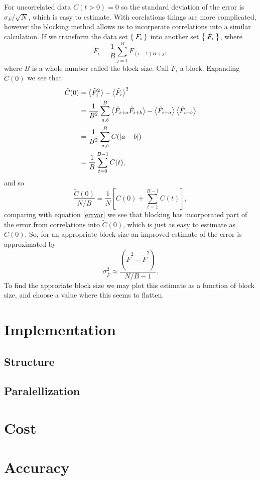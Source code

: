 \documentclass[a4paper,English,10pt]{article}
\newcommand{\be}{\begin{equation}}
\newcommand{\ee}{\end{equation}}
\newcommand{\f}{\frac}
\renewcommand{\bar}{\overline}
\renewcommand{\braket}{\Braket}
\begin{document}
For uncorrelated data $C(t>0) = 0$ so the standard deviation of the error is $\sigma_F/\sqrt{N}$, which is easy to estimate.
With corelations things are more complicated, however the blocking method allows us to incorperate correlations into a similar calculation.
If we transform the data set $\Set{F_i}$ into another set $\Set{\tilde{F}_i}$, where
\be
\tilde{F}_i = \f{1}{B}\sum_{j=1}^{B}F_{(i-1)B+j},\label{block}
\ee
where $B$ is a whole number called the block size. Call $\tilde{F}_i$ a block.
Expanding $\tilde{C}(0)$ we see that
\begin{align*}
  \tilde{C}(0) &= \braket{\tilde{F}_i^2}-\braket{\tilde{F}_i}^2\\
  &= \f{1}{B^2}\sum_{a,b}^B\braket{\tilde{F}_{i+a}\tilde{F}_{i+b}}-\braket{\tilde{F}_{i+a}}\braket{\tilde{F}_{i+b}}\\
  &= \f{1}{B^2}\sum_{a,b}^BC(|a-b|)\\
  &= \f{1}{B}\sum_{t=0}^{B-1}C(t),
\end{align*}
and so
\be
\f{\tilde{C}(0)}{N/B} = \f{1}{N}\left[C(0) +\sum_{t = 1}^{B-1}C(t)\right],\label{blockvar}
\ee
comparing with equation \ref{errvar} we see that blocking has incorporated part of the error from correlations into $\tilde{C}(0)$, which is just as easy to estimate
as $C(0)$. So, for an appropriate block size an improved estimate of the error is approximated by
\be
\sigma_{\bar{F}}^2 \approx \f{\left(\bar{\tilde{F}^2}-\bar{\tilde{F}}^2\right)}{N/B -1}.\label{errest}
\ee
To find the approriate block size we may plot this estimate as a function of block size, and choose a value where this seems to flatten. 

\section{Implementation}

\subsection{Structure}
\subsection{Paralellization}

\section{Cost}

\section{Accuracy}
\end{document}
